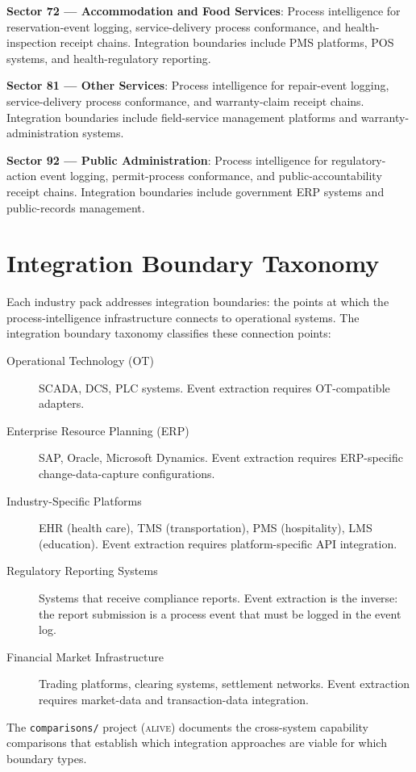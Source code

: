 \textbf{Sector 72 --- Accommodation and Food Services}: Process intelligence for reservation-event logging, service-delivery process conformance, and health-inspection receipt chains. Integration boundaries include PMS platforms, POS systems, and health-regulatory reporting.

\textbf{Sector 81 --- Other Services}: Process intelligence for repair-event logging, service-delivery process conformance, and warranty-claim receipt chains. Integration boundaries include field-service management platforms and warranty-administration systems.

\textbf{Sector 92 --- Public Administration}: Process intelligence for regulatory-action event logging, permit-process conformance, and public-accountability receipt chains. Integration boundaries include government ERP systems and public-records management.

\section{Integration Boundary Taxonomy}

Each industry pack addresses integration boundaries: the points at which the process-intelligence infrastructure connects to operational systems. The integration boundary taxonomy classifies these connection points:

\begin{description}
  \item[Operational Technology (OT)] SCADA, DCS, PLC systems. Event extraction requires OT-compatible adapters.
  \item[Enterprise Resource Planning (ERP)] SAP, Oracle, Microsoft Dynamics. Event extraction requires ERP-specific change-data-capture configurations.
  \item[Industry-Specific Platforms] EHR (health care), TMS (transportation), PMS (hospitality), LMS (education). Event extraction requires platform-specific API integration.
  \item[Regulatory Reporting Systems] Systems that receive compliance reports. Event extraction is the inverse: the report submission is a process event that must be logged in the event log.
  \item[Financial Market Infrastructure] Trading platforms, clearing systems, settlement networks. Event extraction requires market-data and transaction-data integration.
\end{description}

The \texttt{comparisons/} project (\textsc{alive}) documents the cross-system capability comparisons that establish which integration approaches are viable for which boundary types.

